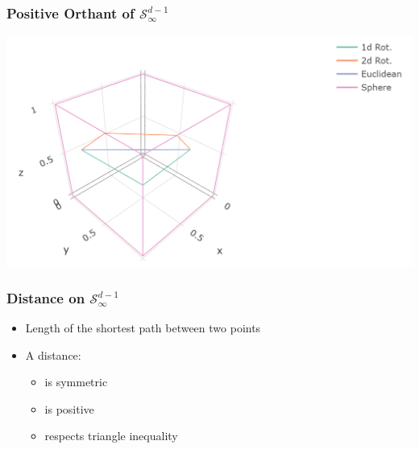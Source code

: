 \documentclass[aspectratio=169]{beamer}
\begin{document}

\begin{frame}
  \frametitle{Positive Orthant of $\mathcal{S}_{\infty}^{d-1}$}
  \begin{center}
    \includegraphics[width=0.9\linewidth]{./images/rotation}
  \end{center}
\end{frame}

\begin{frame}
  \frametitle{Distance on $\mathcal{S}_{\infty}^{d-1}$}
  \begin{itemize}
    \item Length of the shortest path between two points
    \pause
    \item A distance:
      \begin{itemize}
        \item is symmetric
        \item is positive
        \item respects triangle inequality
      \end{itemize}
  \end{itemize}
\end{frame}
\end{document}

